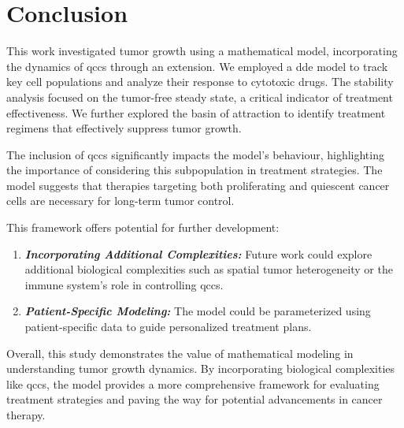 \chapter{Conclusion}



This work investigated tumor growth using a mathematical model, incorporating the dynamics of \gls{qcc}s through an extension. We employed a \gls{dde} model to track key cell populations and analyze their response to cytotoxic drugs. The stability analysis focused on the tumor-free steady state, a critical indicator of treatment effectiveness. We further explored the basin of attraction to identify treatment regimens that effectively suppress tumor growth.

The inclusion of \gls{qcc}s significantly impacts the model's behaviour, highlighting the importance of considering this subpopulation in treatment strategies. The model suggests that therapies targeting both proliferating and quiescent cancer cells are necessary for long-term tumor control.

This framework offers potential for further development:

\begin{enumerate}
    \item \textbf{\textit{Incorporating Additional Complexities:}} Future work could explore additional biological complexities such as spatial tumor heterogeneity or the immune system's role in controlling \gls{qcc}s.
    \item \textbf{\textit{Patient-Specific Modeling:}} The model could be parameterized using patient-specific data to guide personalized treatment plans.
\end{enumerate}

Overall, this study demonstrates the value of mathematical modeling in understanding tumor growth dynamics. By incorporating biological complexities like \gls{qcc}s, the model provides a more comprehensive framework for evaluating treatment strategies and paving the way for potential advancements in cancer therapy.
